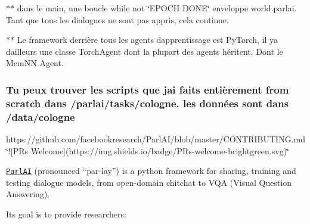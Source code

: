 \begin{DoxyItemize}
\item $\ast$$\ast$ dans le main, une boucle while not \char`\"{}\+E\+P\+O\+C\+H D\+O\+N\+E\char`\"{} enveloppe world.\+parlai. Tant que tous les dialogues ne sont pas appris, cela continue.
\item $\ast$$\ast$ Le framework derrière tous les agents d\textquotesingle{}apprentissage est Py\+Torch, il y\textquotesingle{}a d\textquotesingle{}ailleurs une classe Torch\+Agent dont la plupart des agents héritent. Dont le Mem\+NN Agent.
\end{DoxyItemize}

\subsubsection*{Tu peux trouver les scripts que j\textquotesingle{}ai faits entièrement from scratch dans /parlai/tasks/cologne. les données sont dans /data/cologne}



\href{https://github.com/facebookresearch/ParlAI/blob/master/LICENSE}{\tt } \href{https://circleci.com/gh/facebookresearch/ParlAI/tree/master}{\tt } https\+://github.com/facebookresearch/\+Parl\+A\+I/blob/master/\+C\+O\+N\+T\+R\+I\+B\+U\+T\+I\+N\+G.\+md \char`\"{}!\mbox{[}\+P\+Rs Welcome\mbox{]}(https\+://img.\+shields.\+io/badge/\+P\+Rs-\/welcome-\/brightgreen.\+svg)\char`\"{} \href{https://twitter.com/parlai_parley}{\tt } 



\href{http://parl.ai}{\tt Parl\+AI} (pronounced “par-\/lay”) is a python framework for sharing, training and testing dialogue models, from open-\/domain chitchat to V\+QA (Visual Question Answering).

Its goal is to provide researchers\+:


